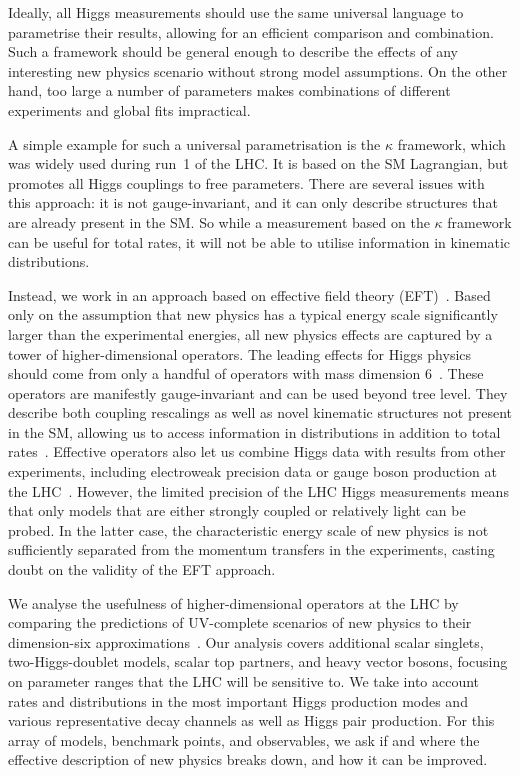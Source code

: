 \newparagraph
%
Ideally, all Higgs measurements should use the same universal language
to parametrise their results, allowing for an efficient comparison
and combination. Such a framework should be general enough to describe
the effects of any interesting new physics scenario without strong model
assumptions. On the other hand, too large a number of parameters makes
combinations of different experiments and global fits impractical.

A simple example for such a universal parametrisation is the $\kappa$
framework, which was widely used during run~1 of the LHC. It is based
on the SM Lagrangian, but promotes all Higgs couplings to free
parameters. There are several issues with this approach: it is not
gauge-invariant, and it can only describe structures that are already
present in the SM. So while a measurement based on the $\kappa$
framework can be useful for total rates, it will not be able to
utilise information in kinematic distributions.

Instead, we work in an approach based on effective field theory
(EFT)~\cite{Coleman:1969sm, Callan:1969sn, Weinberg:1980wa}. Based
only on the assumption that new physics has a typical energy scale
significantly larger than the experimental energies, all new physics
effects are captured by a tower of higher-dimensional operators. The
leading effects for Higgs physics should come from only a handful of
operators with mass dimension 6~\cite{Burges:1983zg, Leung:1984ni,
  Buchmuller:1985jz}. These operators are manifestly gauge-invariant
and can be used beyond tree level. They describe both coupling
rescalings as well as novel kinematic structures not present in the
SM, allowing us to access information in distributions in addition to
total rates~\cite{Corbett:2012ja, Corbett:2015ksa}. Effective
operators also let us combine Higgs data with results from other
experiments, including electroweak precision data or gauge boson
production at the LHC~\cite{Butter:2016cvz}. However, the limited
precision of the LHC Higgs measurements means that only models that
are either strongly coupled or relatively light can be probed. In the
latter case, the characteristic energy scale of new physics is not
sufficiently separated from the momentum transfers in the experiments,
casting doubt on the validity of the EFT approach.

We analyse the usefulness of higher-dimensional operators at the LHC
by comparing the predictions of UV-complete scenarios of new physics
to their dimension-six approximations~\cite{Brehmer:2015rna}. Our
analysis covers additional scalar singlets, two-Higgs-doublet models,
scalar top partners, and heavy vector bosons, focusing on parameter
ranges that the LHC will be sensitive to. We take into account rates
and distributions in the most important Higgs production modes and
various representative decay channels as well as Higgs pair
production. For this array of models, benchmark points, and
observables, we ask if and where the effective description of new
physics breaks down, and how it can be improved.

